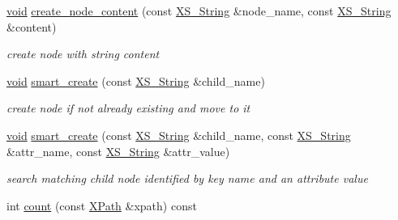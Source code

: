\begin{DoxyCompactItemize}
\mbox{\label{struct_x_m_l_storage_1_1_x_m_l_pos_a3fbc5a0d093e58c7e00edf1c0492e224}} 
\hyperlink{interfacevoid}{void} \hyperlink{struct_x_m_l_storage_1_1_x_m_l_pos_a3fbc5a0d093e58c7e00edf1c0492e224}{create\+\_\+node\+\_\+content} (const \hyperlink{struct_x_m_l_storage_1_1_x_s___string}{X\+S\+\_\+\+String} \&node\+\_\+name, const \hyperlink{struct_x_m_l_storage_1_1_x_s___string}{X\+S\+\_\+\+String} \&content)
\begin{DoxyCompactList}\small\item\em create node with string content \end{DoxyCompactList}\item 
\mbox{\label{struct_x_m_l_storage_1_1_x_m_l_pos_a5dec14f29a18337bd9b0ddeebdb6f20f}} 
\hyperlink{interfacevoid}{void} \hyperlink{struct_x_m_l_storage_1_1_x_m_l_pos_a5dec14f29a18337bd9b0ddeebdb6f20f}{smart\+\_\+create} (const \hyperlink{struct_x_m_l_storage_1_1_x_s___string}{X\+S\+\_\+\+String} \&child\+\_\+name)
\begin{DoxyCompactList}\small\item\em create node if not already existing and move to it \end{DoxyCompactList}\item 
\mbox{\label{struct_x_m_l_storage_1_1_x_m_l_pos_a4e71fd2c91326ac81e5869488896e5a5}} 
\hyperlink{interfacevoid}{void} \hyperlink{struct_x_m_l_storage_1_1_x_m_l_pos_a4e71fd2c91326ac81e5869488896e5a5}{smart\+\_\+create} (const \hyperlink{struct_x_m_l_storage_1_1_x_s___string}{X\+S\+\_\+\+String} \&child\+\_\+name, const \hyperlink{struct_x_m_l_storage_1_1_x_s___string}{X\+S\+\_\+\+String} \&attr\+\_\+name, const \hyperlink{struct_x_m_l_storage_1_1_x_s___string}{X\+S\+\_\+\+String} \&attr\+\_\+value)
\begin{DoxyCompactList}\small\item\em search matching child node identified by key name and an attribute value \end{DoxyCompactList}\item 
\mbox{\label{struct_x_m_l_storage_1_1_x_m_l_pos_addf990db35ad8b8f87b7d6c4d1b46d86}} 
int \hyperlink{struct_x_m_l_storage_1_1_x_m_l_pos_addf990db35ad8b8f87b7d6c4d1b46d86}{count} (const \hyperlink{struct_x_m_l_storage_1_1_x_path}{X\+Path} \&xpath) const

\end{DoxyCompactItemize}
